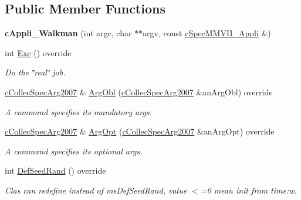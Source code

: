 \subsection*{Public Member Functions}
\begin{DoxyCompactItemize}
\item 
{\bfseries c\+Appli\+\_\+\+Walkman} (int argc, char $\ast$$\ast$argv, const \hyperlink{classMMVII_1_1cSpecMMVII__Appli}{c\+Spec\+M\+M\+V\+I\+I\+\_\+\+Appli} \&)\hypertarget{classMMVII_1_1cAppli__Walkman_a7ddf4604dc9656d9df889c71b5937ca9}{}\label{classMMVII_1_1cAppli__Walkman_a7ddf4604dc9656d9df889c71b5937ca9}

\item 
int \hyperlink{classMMVII_1_1cAppli__Walkman_ac9bf1d94dc0c7ddc341084b7fc9a81f2}{Exe} () override\hypertarget{classMMVII_1_1cAppli__Walkman_ac9bf1d94dc0c7ddc341084b7fc9a81f2}{}\label{classMMVII_1_1cAppli__Walkman_ac9bf1d94dc0c7ddc341084b7fc9a81f2}

\begin{DoxyCompactList}\small\item\em Do the \char`\"{}real\char`\"{} job. \end{DoxyCompactList}\item 
\hyperlink{classMMVII_1_1cCollecSpecArg2007}{c\+Collec\+Spec\+Arg2007} \& \hyperlink{classMMVII_1_1cAppli__Walkman_aeef9557003bc7f12d4e0b97b2d9884dd}{Arg\+Obl} (\hyperlink{classMMVII_1_1cCollecSpecArg2007}{c\+Collec\+Spec\+Arg2007} \&an\+Arg\+Obl) override\hypertarget{classMMVII_1_1cAppli__Walkman_aeef9557003bc7f12d4e0b97b2d9884dd}{}\label{classMMVII_1_1cAppli__Walkman_aeef9557003bc7f12d4e0b97b2d9884dd}

\begin{DoxyCompactList}\small\item\em A command specifies its mandatory args. \end{DoxyCompactList}\item 
\hyperlink{classMMVII_1_1cCollecSpecArg2007}{c\+Collec\+Spec\+Arg2007} \& \hyperlink{classMMVII_1_1cAppli__Walkman_af4278f60ef5bf12bd4c81890c175f11d}{Arg\+Opt} (\hyperlink{classMMVII_1_1cCollecSpecArg2007}{c\+Collec\+Spec\+Arg2007} \&an\+Arg\+Opt) override\hypertarget{classMMVII_1_1cAppli__Walkman_af4278f60ef5bf12bd4c81890c175f11d}{}\label{classMMVII_1_1cAppli__Walkman_af4278f60ef5bf12bd4c81890c175f11d}

\begin{DoxyCompactList}\small\item\em A command specifies its optional args. \end{DoxyCompactList}\item 
int \hyperlink{classMMVII_1_1cAppli__Walkman_a1b997885d1d205177830096b60543e7e}{Def\+Seed\+Rand} () override\hypertarget{classMMVII_1_1cAppli__Walkman_a1b997885d1d205177830096b60543e7e}{}\label{classMMVII_1_1cAppli__Walkman_a1b997885d1d205177830096b60543e7e}

\begin{DoxyCompactList}\small\item\em Clas can redefine instead of ms\+Def\+Seed\+Rand, value $<$=0 mean init from time\+:w. \end{DoxyCompactList}\end{DoxyCompactItemize}
